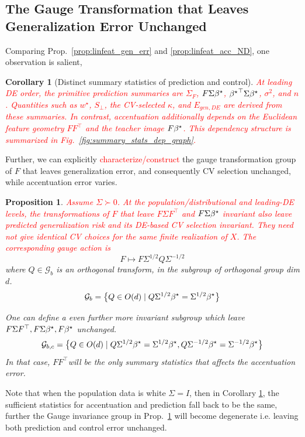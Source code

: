 \documentclass{article}
\newcommand{\red}[1]{\textcolor{red}{#1}}
\providecommand{\propositionname}{Proposition}
\providecommand{\corollaryname}{Corollary}
\theoremstyle{plain}
\newtheorem{prop}[thm]{\propositionname}
\newtheorem{cor}[thm]{\corollaryname}
\theoremstyle{definition}
\theoremstyle{remark}
\begin{document}
\subsection{The Gauge Transformation that Leaves Generalization Error Unchanged}
\label{sec:feature-gauge}
Comparing Prop.~\ref{prop:linfeat_gen_err} and \ref{prop:linfeat_acc_ND}, one observation is salient,
\begin{cor}[Distinct summary statistics of prediction and control]\label{cor:feature-summary-statistics}
\red{At leading DE order, the primitive prediction summaries are $\Sigma_F$, $F\Sigma{\beta^{\star}}$, ${{\beta^{\star}}}^{\top}\Sigma{\beta^{\star}}$, $\sigma^2$, and $n$. Quantities such as $w^\star$, $S_\perp$, the CV-selected $\kappa$, and $E_{gen,DE}$ are derived from these summaries. In contrast, accentuation additionally depends on the Euclidean feature geometry $FF^\top$ and the teacher image $F{\beta^{\star}}$. This dependency structure is summarized in Fig.~\ref{fig:summary_stats_dep_graph}.}
\end{cor}

Further, we can explicitly \red{characterize/construct} the gauge transformation group of $F$ that leaves generalization error, and consequently CV selection
unchanged, while accentuation error varies.
\begin{prop}\label{prop:feature-gauge-family}
\red{Assume $\Sigma\succ0$. At the population/distributional and leading-DE levels, the transformations of $F$ that leave $F\Sigma F^\top$ and $F\Sigma{\beta^{\star}}$ invariant also leave predicted generalization risk and its DE-based CV selection invariant. They need not give identical CV choices for the same finite realization of $X$. The corresponding gauge action is}
\[
F\mapsto F\Sigma^{1/2}Q\Sigma^{-1/2}
\]
where $Q\in\mathcal{G}_{b}$ is an orthogonal transform, in the subgroup
of orthogonal group dim $d$.
\[
\mathcal{G}_{b}=\big\{ Q\in O(d)\mid Q\Sigma^{1/2}{\beta^{\star}}=\Sigma^{1/2}{\beta^{\star}}\big\}
\]

One can define a even further more invariant subgroup which leave
$F\Sigma F^{\top},F\Sigma{\beta^{\star}},F{\beta^{\star}}$ unchanged.
\[
\mathcal{G}_{b,c}=\big\{ Q\in O(d)\mid Q\Sigma^{1/2}{\beta^{\star}}=\Sigma^{1/2}{\beta^{\star}},Q\Sigma^{-1/2}{\beta^{\star}}=\Sigma^{-1/2}{\beta^{\star}}\big\}
\]
In that case, $FF^{\top}$will be the only summary statistics that
affects the accentuation error.
\end{prop}

Note that when the population data is white $\Sigma=I$, then in Corollary \ref{cor:feature-summary-statistics}, the sufficient statistics for accentuation and prediction fall back to be the same, further the Gauge invariance group in Prop.~\ref{prop:feature-gauge-family} will become degenerate i.e. leaving both prediction and control error unchanged. 
\end{document}
